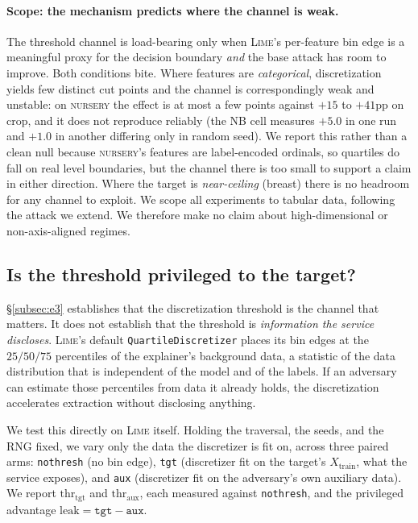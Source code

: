 \documentclass[sigconf,anonymous,review]{acmart}
\begin{document}
\paragraph{Scope: the mechanism predicts where the channel is weak.} The threshold channel is
load-bearing only when \textsc{Lime}'s per-feature bin edge is a meaningful proxy for the decision
boundary \emph{and} the base attack has room to improve. Both conditions bite. Where features are
\emph{categorical}, discretization yields few distinct cut points and the channel is correspondingly
weak and unstable: on \textsc{nursery} the effect is at most a few points against $+15$ to $+41$pp on
crop, and it does not reproduce reliably (the NB cell measures $+5.0$ in one run and $+1.0$ in another differing only in random seed). We report this rather than a clean null because
\textsc{nursery}'s features are label-encoded ordinals, so quartiles do fall on real level boundaries, but the channel there is too small to support a claim in either direction. Where the target is \emph{near-ceiling} (breast) there is
no headroom for any channel to exploit. We scope all experiments to tabular data, following the attack we extend. We therefore make no claim about high-dimensional or non-axis-aligned regimes.

\subsection{Is the threshold privileged to the target?}
\label{subsec:e5}
\S\ref{subsec:e3} establishes that the discretization threshold is the channel that matters. It does
not establish that the threshold is \emph{information the service discloses}. \textsc{Lime}'s default
\texttt{QuartileDiscretizer} places its bin edges at the $25/50/75$ percentiles of the explainer's background data, a statistic of the data distribution that is independent of the model and of the
labels. If an adversary can estimate those percentiles from data it already holds, the discretization
accelerates extraction without disclosing anything.

We test this directly on \textsc{Lime} itself. Holding the traversal, the seeds, and the RNG fixed, we
vary only the data the discretizer is fit on, across three paired arms: \texttt{nothresh} (no bin
edge), \texttt{tgt} (discretizer fit on the target's $X_{\text{train}}$, what the service exposes),
and \texttt{aux} (discretizer fit on the adversary's own auxiliary data). We report
$\text{thr}_{\text{tgt}}$ and $\text{thr}_{\text{aux}}$, each measured against \texttt{nothresh}, and
the privileged advantage $\text{leak}=\texttt{tgt}-\texttt{aux}$.
\end{document}
